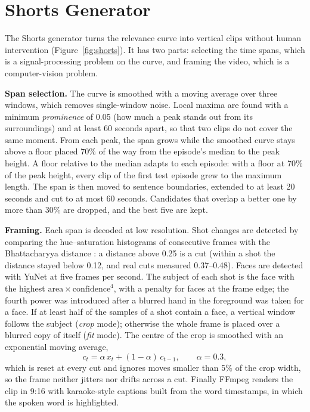 \section{Shorts Generator}

The Shorts generator turns the relevance curve into vertical clips without human intervention (Figure~\ref{fig:shorts}). It has two parts: selecting the time spans, which is a signal-processing problem on the curve, and framing the video, which is a computer-vision problem.

\textbf{Span selection.} The curve is smoothed with a moving average over three windows, which removes single-window noise. Local maxima are found with a minimum \textit{prominence} of 0.05 (how much a peak stands out from its surroundings) and at least 60 seconds apart, so that two clips do not cover the same moment. From each peak, the span grows while the smoothed curve stays above a floor placed 70\% of the way from the episode's median to the peak height. A floor relative to the median adapts to each episode: with a floor at 70\% of the peak height, every clip of the first test episode grew to the maximum length. The span is then moved to sentence boundaries, extended to at least 20 seconds and cut to at most 60 seconds. Candidates that overlap a better one by more than 30\% are dropped, and the best five are kept.

\textbf{Framing.} Each span is decoded at low resolution. Shot changes are detected by comparing the hue--saturation histograms of consecutive frames with the Bhattacharyya distance \cite{bhattacharyya1943}: a distance above 0.25 is a cut (within a shot the distance stayed below 0.12, and real cuts measured 0.37--0.48). Faces are detected with YuNet \cite{wu2023yunet} at five frames per second. The subject of each shot is the face with the highest $\text{area} \times \text{confidence}^4$, with a penalty for faces at the frame edge; the fourth power was introduced after a blurred hand in the foreground was taken for a face. If at least half of the samples of a shot contain a face, a vertical window follows the subject (\textit{crop} mode); otherwise the whole frame is placed over a blurred copy of itself (\textit{fit} mode). The centre of the crop is smoothed with an exponential moving average,
\begin{equation}
c_t = \alpha\, x_t + (1-\alpha)\, c_{t-1}, \qquad \alpha = 0.3,
\label{eq:ema}
\end{equation}
which is reset at every cut and ignores moves smaller than 5\% of the crop width, so the frame neither jitters nor drifts across a cut. Finally FFmpeg renders the clip in 9:16 with karaoke-style captions built from the word timestamps, in which the spoken word is highlighted.

